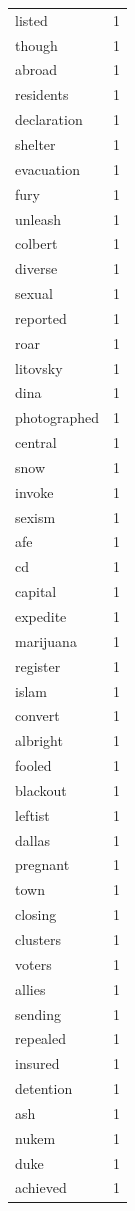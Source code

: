 \begin{tabular}{lr}
listed & 1 \\
though & 1 \\
abroad & 1 \\
residents & 1 \\
declaration & 1 \\
shelter & 1 \\
evacuation & 1 \\
fury & 1 \\
unleash & 1 \\
colbert & 1 \\
diverse & 1 \\
sexual & 1 \\
reported & 1 \\
roar & 1 \\
litovsky & 1 \\
dina & 1 \\
photographed & 1 \\
central & 1 \\
snow & 1 \\
invoke & 1 \\
sexism & 1 \\
afe & 1 \\
cd & 1 \\
capital & 1 \\
expedite & 1 \\
marijuana & 1 \\
register & 1 \\
islam & 1 \\
convert & 1 \\
albright & 1 \\
fooled & 1 \\
blackout & 1 \\
leftist & 1 \\
dallas & 1 \\
pregnant & 1 \\
town & 1 \\
closing & 1 \\
clusters & 1 \\
voters & 1 \\
allies & 1 \\
sending & 1 \\
repealed & 1 \\
insured & 1 \\
detention & 1 \\
ash & 1 \\
nukem & 1 \\
duke & 1 \\
achieved & 1 \\

\end{tabular}

